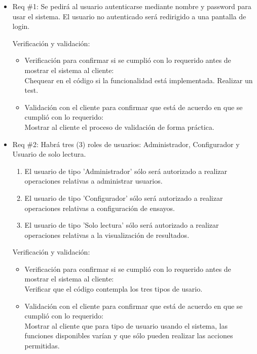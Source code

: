 \documentclass[11pt]{charter}
\begin{document}
\begin{itemize}
\item Req \#1: Se pedirá al usuario autenticarse mediante nombre y password para usar el sistema. El usuario no autenticado será redirigido a una pantalla de login.

Verificación y validación:

\begin{itemize}
\item Verificación para confirmar si se cumplió con lo requerido antes de mostrar el sistema al cliente:\\
Chequear en el código si la funcionalidad está implementada. Realizar un test.
\item Validación con el cliente para confirmar que está de acuerdo en que se cumplió con lo requerido:\\
Mostrar al cliente el proceso de validación de forma práctica. 
\end{itemize}

\item Req \#2: Habrá tres (3) roles de usuarios: Administrador, Configurador y Usuario de solo lectura.
		\begin{enumerate}
		\item El usuario de tipo 'Administrador' sólo será autorizado a realizar operaciones relativas a administrar usuarios.
		\item El usuario de tipo 'Configurador' sólo será autorizado a realizar operaciones relativas a configuración de ensayos.
		\item El usuario de tipo 'Solo lectura' sólo será autorizado a realizar operaciones relativas a la visualización de resultados.
		\end{enumerate}

Verificación y validación:

\begin{itemize}
\item Verificación para confirmar si se cumplió con lo requerido antes de mostrar el sistema al cliente:\\
Verificar que el código contempla los tres tipos de usario.
 
\item Validación con el cliente para confirmar que está de acuerdo en que se cumplió con lo requerido:\\
Mostrar al cliente que para tipo de usuario usando el sistema, las funciones disponibles varían y que sólo pueden realizar las acciones permitidas.
\end{itemize}



\end{itemize}
\end{document}
